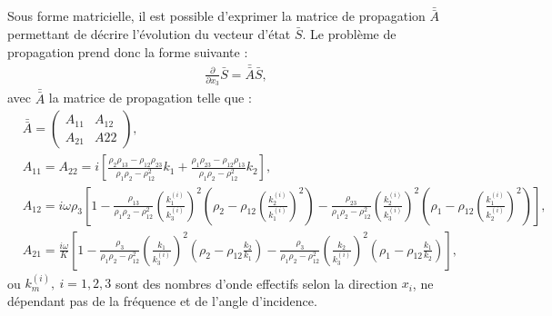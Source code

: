 \documentclass[12pt]{report}
\begin{document}
    Sous forme matricielle, il est possible d'exprimer la matrice de propagation $\bar{\bar{A}}$ permettant de décrire l'évolution du vecteur d'état $\bar{S}$. Le problème de propagation prend donc la forme suivante :
    \begin{align}
    \frac{\partial}{\partial x_3}\bar{S} = \bar{\bar{A}} \bar{S},\label{Equa_diff}
    \end{align}
    avec $\bar{\bar{A}}$ la matrice de propagation telle que :
     \begin{align}
     &\bar{\bar{A}}=\begin{pmatrix}
    				A_{11} & A_{12} \\ A_{21} & A{22}
    			\end{pmatrix}\label{Matrice_complete},\\ 
     &A_{11}=A_{22}=i[\frac{\rho_2\rho_{13}-\rho_{12}\rho_{23}}{\rho_1\rho_2-\rho_{12}^2}k_1+\frac{\rho_1\rho_{23}-\rho_{12}\rho_{13}}{\rho_1\rho_2-\rho_{12}^2}k_2], \\
     &A_{12}=i\omega \rho_3[1-\frac{\rho_{13}}{\rho_1\rho_2-\rho_{12}^2}(\frac{k_1^{(i)}}{k_3^{(i)}})^2(\rho_2-\rho_{12}(\frac{k_2^{(i)}}{k_1^{(i)}})^2)-\frac{\rho_{23}}{\rho_1\rho_2-\rho_{12}^2}(\frac{k_2^{(i)}}{k_3^{(i)}})^2(\rho_1-\rho_{12}(\frac{k_1^{(i)}}{k_2^{(i)}})^2)], \\
     &A_{21}=\frac{i\omega}{K}[1-\frac{\rho_3}{\rho_1\rho_2-\rho_{12}^2}(\frac{k_1}{k_3^{(i)}})^2(\rho_2-\rho_{12}\frac{k_2}{k_1})-\frac{\rho_3}{\rho_1\rho_2-\rho_{12}^2}(\frac{k_2}{k_3^{(i)}})^2(\rho_1-\rho_{12}\frac{k_1}{k_2})],
    \end{align}
    ou $k_m^{(i)},\ i=1,2,3$ sont des nombres d'onde effectifs selon la direction $x_i$, ne dépendant pas de la fréquence et de l'angle d'incidence.
    
\end{document}
